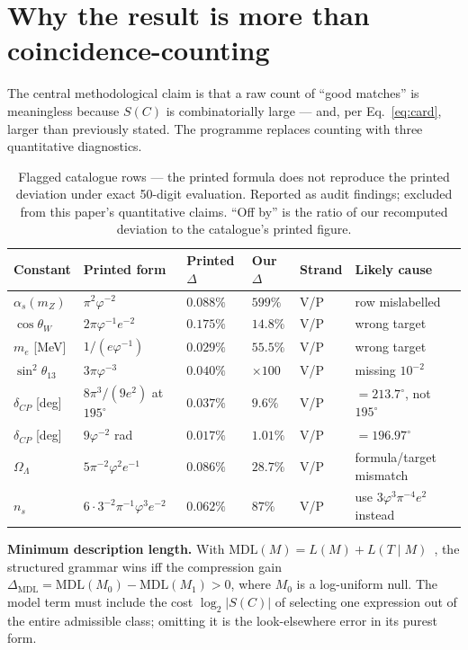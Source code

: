 \documentclass[11pt]{article}
\newcommand{\phigr}{\varphi}
\begin{document}
\section{Why the result is more than coincidence-counting}\label{sec:morethan}
The central methodological claim is that a raw count of ``good matches'' is meaningless because $S(C)$ is combinatorially large --- and, per Eq.~\eqref{eq:card}, larger than previously stated. The programme replaces counting with three quantitative diagnostics.

\begin{table}[ht]
\centering
\caption{Flagged catalogue rows --- the printed formula does not reproduce the printed deviation under exact 50-digit evaluation. Reported as audit findings; excluded from this paper's quantitative claims. ``Off by'' is the ratio of our recomputed deviation to the catalogue's printed figure.}
\label{tab:flagged}
\small
\begin{tabular}{@{}lllllp{3cm}@{}}
\toprule
Constant & Printed form & Printed $\Delta$ & Our $\Delta$ & Strand & Likely cause \\
\midrule
$\alpha_s(m_Z)$ & $\pi^2\phigr^{-2}$ & $0.088\%$ & $599\%$ & V/P & row mislabelled \\
$\cos\theta_W$ & $2\pi\phigr^{-1}e^{-2}$ & $0.175\%$ & $14.8\%$ & V/P & wrong target \\
$m_e$ [MeV] & $1/(e\phigr^{-1})$ & $0.029\%$ & $55.5\%$ & V/P & wrong target \\
$\sin^2\theta_{13}$ & $3\pi\phigr^{-3}$ & $0.040\%$ & $\times 100$ & V/P & missing $10^{-2}$ \\
$\delta_{CP}$ [deg] & $8\pi^3/(9e^2)$ at $195^{\circ}$ & $0.037\%$ & $9.6\%$ & V/P & $= 213.7^{\circ}$, not $195^{\circ}$ \\
$\delta_{CP}$ [deg] & $9\phigr^{-2}$ rad & $0.017\%$ & $1.01\%$ & V/P & $= 196.97^{\circ}$ \\
$\Omega_\Lambda$ & $5\pi^{-2}\phigr^2 e^{-1}$ & $0.086\%$ & $28.7\%$ & V/P & formula/target mismatch \\
$n_s$ & $6 \cdot 3^{-2}\pi^{-1}\phigr^3 e^{-2}$ & $0.062\%$ & $87\%$ & V/P & use $3\phigr^3\pi^{-4}e^2$ instead \\
\bottomrule
\end{tabular}
\end{table}

\noindent\textbf{Minimum description length.} With $\mathrm{MDL}(M) = L(M) + L(T \mid M)$~\cite{rissanen}, the structured grammar wins iff the compression gain $\Delta_{\mathrm{MDL}} = \mathrm{MDL}(M_0) - \mathrm{MDL}(M_1) > 0$, where $M_0$ is a log-uniform null. The model term must include the cost $\log_2 |S(C)|$ of selecting one expression out of the entire admissible class; omitting it is the look-elsewhere error in its purest form.
\end{document}
